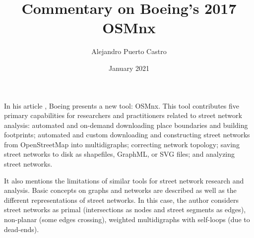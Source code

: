 \documentclass[12pt, letterpaper]{article}
\title{Commentary on Boeing's 2017 OSMnx}
\author{Alejandro Puerto Castro}
\date{January 2021}
\begin{document}
	
	\maketitle
	
	In his article \cite{boeing_osmnx_2017}, Boeing presents a new tool: OSMnx. This tool contributes five primary capabilities for researchers and practitioners related to street network analysis: automated and on-demand downloading place boundaries and building footprints; automated and custom downloading and constructing street networks from OpenStreetMap into multidigraphs; correcting network topology; saving street networks to disk as shapefiles, GraphML, or SVG files; and analyzing street networks.
	
	It also mentions the limitations of similar tools for street network research and analysis. Basic concepts on graphs and networks are described as well as the different representations of street networks. In this case, the author considers street networks as primal (intersections as nodes and street segments as edges), non-planar (some edges crossing), weighted multidigraphs with self-loops (due to dead-ends).
	
\end{document}
